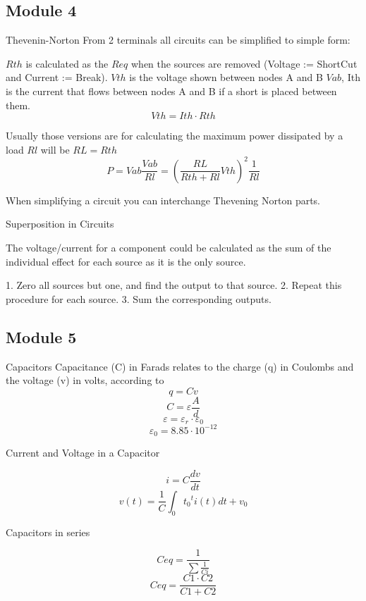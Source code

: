 \documentclass[]{article}
\begin{document}
\subsection{Module 4}
Thevenin-Norton
From 2 terminals all circuits can be simplified to simple form:


$Rth$ is calculated as the $Req$ when the sources are removed (Voltage := ShortCut and Current := Break). $Vth$ is the voltage shown between nodes A and B $Vab$, Ith is the current that flows between nodes A and B if a short is placed between them.
$$Vth=Ith\cdot Rth$$

Usually those versions are for calculating the maximum power dissipated by a load $Rl$ will be $RL=Rth$
$$P=Vab\frac{Vab}{Rl}=\left(\frac{RL}{Rth+Rl}Vth\right)^2 \frac{1}{Rl}$$

When simplifying a circuit you can interchange Thevening Norton parts.

Superposition in Circuits

The voltage/current for a component could be calculated as the sum of the individual effect for each source as it is the only source.

1. Zero all sources but one, and find the
output to that source.
2. Repeat this procedure for each source.
3. Sum the corresponding outputs.

\subsection{Module 5}
Capacitors
Capacitance (C) in Farads relates to the charge (q) in Coulombs and the voltage (v) in volts, according to
$$q=Cv$$
$$C=\varepsilon\frac{A}{d}$$
$$\varepsilon=\varepsilon_r\cdot\varepsilon_0$$
$$\varepsilon_0=8.85\cdot 10^{-12}$$

Current and Voltage in a Capacitor

$$i=C\frac{dv}{dt}$$
$$v(t)=\frac{1}{C}\int_0{t_0}^{t}{i(t)dt}+v_0$$	

Capacitors in series

$$Ceq=\frac{1}{\sum\frac{1}{Ci}}$$
$$Ceq=\frac{C1\cdot C2}{C1+C2}$$
\end{document}
